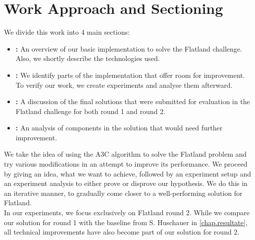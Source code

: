 \section{Work Approach and Sectioning}\label{basic_cons}
We divide this work into 4 main sections:
\begin{itemize}
	\item \textbf{:} An overview of our basic implementation to solve the Flatland challenge. Also, we shortly describe the technologies used.
	\item \textbf{:} We identify parts of the implementation that offer room for improvement. To verify our work, we create experiments and analyse them afterward.
	\item \textbf{:} A discussion of the final solutions that were submitted for evaluation in the Flatland challenge for both round 1 and round 2.
	\item \textbf{:} An analysis of components in the solution that would need further improvement.
\end{itemize}
We take the idea of using the A3C algorithm to solve the Flatland problem and try various modifications in an attempt to improve its performance. We proceed by giving an idea, what we want to achieve, followed by an experiment setup and an experiment analysis to either prove or disprove our hypothesis. We do this in an iterative manner, to gradually come closer to a well-performing solution for Flatland.\\
In our experiments, we focus exclusively on Flatland round 2. While we compare our solution for round 1 with the baseline from S. Huschauer in \autoref{chap.resultate}, all technical improvements have also become part of our solution for round 2.
